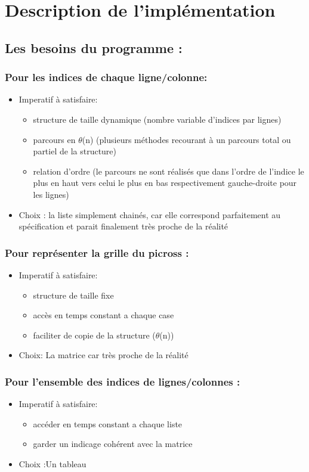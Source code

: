 \documentclass{article}
\begin{document}
\section{Description de l'implémentation}
\subsection{ Les besoins du programme :}

\subsubsection{Pour les indices de chaque ligne/colonne:}
\begin{itemize}
\item Imperatif à satisfaire:
\begin{itemize}
\item structure de taille dynamique (nombre variable d'indices par lignes)
\item parcours en $\theta$(n) (plusieurs méthodes recourant à  un parcours total ou partiel de la structure)
\item relation d'ordre (le parcours ne sont réalisés que dans l'ordre de l'indice le plus en haut vers celui le plus en bas respectivement gauche-droite pour les lignes)
\end{itemize}
\item Choix : la liste simplement chainés, car elle correspond parfaitement au spécification et parait finalement très proche de la réalité
\end{itemize}
\subsubsection{Pour représenter la grille du picross :}
\begin{itemize}
\item Imperatif à satisfaire:
\begin{itemize}
\item structure de taille fixe
\item acc\`es en temps constant a chaque case
\item faciliter de copie de la structure ($\theta$(n))
\end{itemize}
\item Choix: La matrice car très proche de la réalité
\end{itemize}
\subsubsection{Pour l'ensemble des indices de lignes/colonnes :}
\begin{itemize}
\item Imperatif à satisfaire:
\begin{itemize}
\item accéder en temps constant a chaque liste
\item garder un indicage cohérent avec la matrice
\end{itemize}
\item Choix :Un tableau
\end{itemize}
\end{document}
